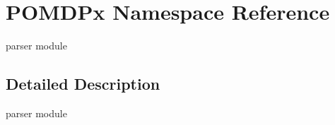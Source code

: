 \hypertarget{namespacePOMDPx}{}\section{P\+O\+M\+D\+Px Namespace Reference}
\label{namespacePOMDPx}


parser module  




\subsection{Detailed Description}
parser module 